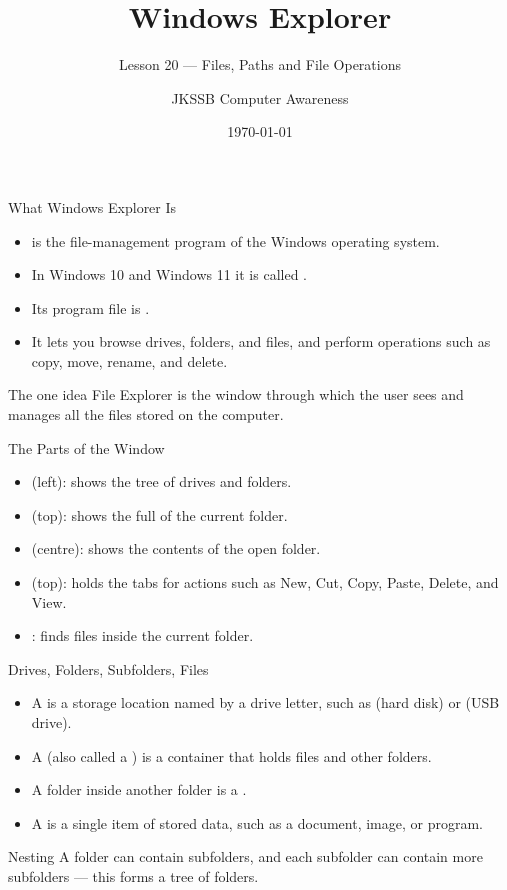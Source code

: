 \documentclass[aspectratio=169]{beamer}
\title{Windows Explorer}
\subtitle{Lesson 20 --- Files, Paths and File Operations}
\author{JKSSB Computer Awareness}
\date{\today}
\begin{document}
\frame{\titlepage}

\begin{frame}{What Windows Explorer Is}
  \begin{itemize}
    \item {} is the file-management program of the Windows
      operating system.
    \item In Windows 10 and Windows 11 it is called .
    \item Its program file is .
    \item It lets you browse drives, folders, and files, and perform
      operations such as copy, move, rename, and delete.
  \end{itemize}
  \begin{block}{The one idea}
    File Explorer is the window through which the user sees and manages all
    the files stored on the computer.
  \end{block}
\end{frame}

\begin{frame}{The Parts of the Window}
  \begin{itemize}
    \item {} (left): shows the tree of drives and folders.
    \item {} (top): shows the full  of the current
      folder.
    \item {} (centre): shows the contents of the open folder.
    \item {} (top): holds the tabs for actions such as
      New, Cut, Copy, Paste, Delete, and View.
    \item {}: finds files inside the current folder.
  \end{itemize}
\end{frame}

\begin{frame}{Drives, Folders, Subfolders, Files}
  \begin{itemize}
    \item A  is a storage location named by a drive letter, such as
       (hard disk) or  (USB drive).
    \item A  (also called a ) is a container that
      holds files and other folders.
    \item A folder inside another folder is a .
    \item A  is a single item of stored data, such as a document,
      image, or program.
  \end{itemize}
  \begin{exampleblock}{Nesting}
    A folder can contain subfolders, and each subfolder can contain more
    subfolders --- this forms a tree of folders.
  \end{exampleblock}
\end{frame}
\end{document}
